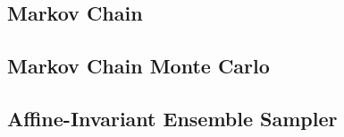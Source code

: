 \subsection{Markov Chain}\label{sub:bc_mcmc_mc}



\subsection{Markov Chain Monte Carlo}\label{sub:bc_mcmc_mcmc}





\subsection{Affine-Invariant Ensemble Sampler}\label{sub:bc_mcmc_aies}







